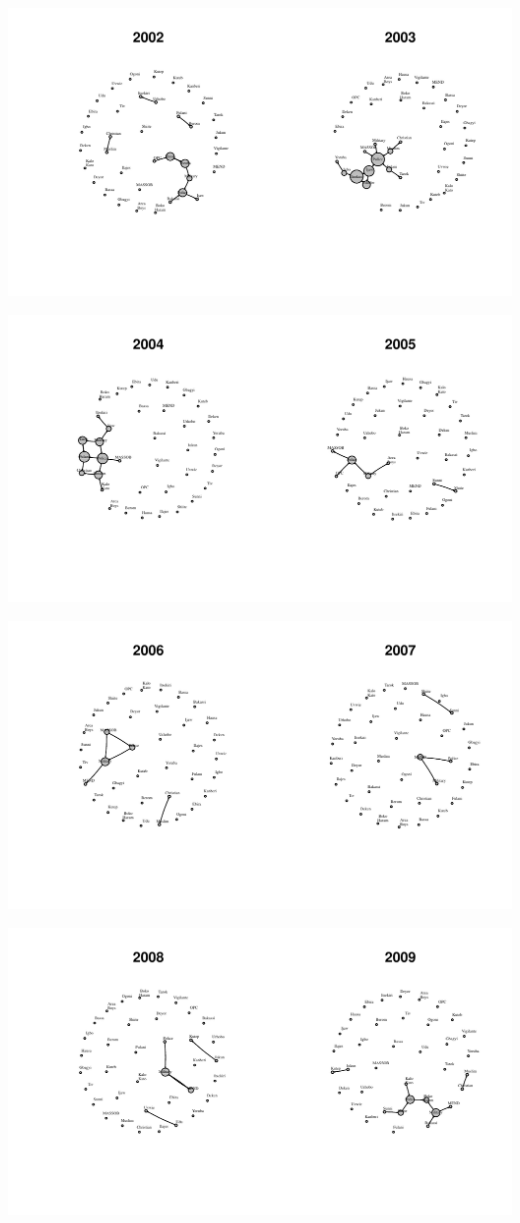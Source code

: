 \documentclass[12pt, letterpaper, notitlepage, onecolumn, twoside, openbib]{article}\usepackage[]{graphicx}\usepackage[]{color}
\newenvironment{knitrout}{}{} %
\begin{document}
\begin{knitrout}
\includegraphics[width=1.1\linewidth]{figure/unnamed-chunk-4-2} 

\includegraphics[width=1.1\linewidth]{figure/unnamed-chunk-4-3} 

\includegraphics[width=1.1\linewidth]{figure/unnamed-chunk-4-4} 

\includegraphics[width=1.1\linewidth]{figure/unnamed-chunk-4-5} 


\end{knitrout}
\end{document}
